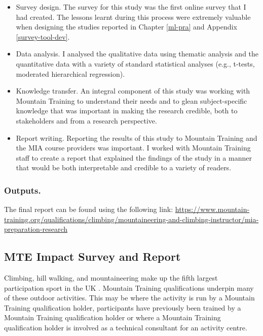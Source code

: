 \documentclass[
  12pt,
  a4paper,
]{book}
\providecommand{\tightlist}{%
  \setlength{\itemsep}{0pt}\setlength{\parskip}{0pt}}
\begin{document}
\begin{itemize}
\tightlist
\item
  Survey design. The survey for this study was the first online survey that I had created. The lessons learnt during this process were extremely valuable when designing the studies reported in Chapter \ref{ml-pra} and Appendix \ref{survey-tool-dev}.
\item
  Data analysis. I analysed the qualitative data using thematic analysis and the quantitative data with a variety of standard statistical analyses (e.g., t-tests, moderated hierarchical regression).
\item
  Knowledge transfer. An integral component of this study was working with Mountain Training to understand their needs and to glean subject-specific knowledge that was important in making the research credible, both to stakeholders and from a research perspective.
\item
  Report writing. Reporting the results of this study to Mountain Training and the MIA course providers was important. I worked with Mountain Training staff to create a report that explained the findings of the study in a manner that would be both interpretable and credible to a variety of readers.
\end{itemize}

\hypertarget{outputs.}{%
\subsubsection{Outputs.}\label{outputs.}}

The final report \citep{Hardy2017b} can be found using the following link: \url{https://www.mountain-training.org/qualifications/climbing/mountaineering-and-climbing-instructor/mia-preparation-research}

\hypertarget{mte-impact-survey-and-report}{%
\subsection{MTE Impact Survey and Report}\label{mte-impact-survey-and-report}}

Climbing, hill walking, and mountaineering make up the fifth largest participation sport in the UK \citep{MTE2019b}. Mountain Training qualifications underpin many of these outdoor activities. This may be where the activity is run by a Mountain Training qualification holder, participants have previously been trained by a Mountain Training qualification holder or where a Mountain Training qualification holder is involved as a technical consultant for an activity centre.
\end{document}
